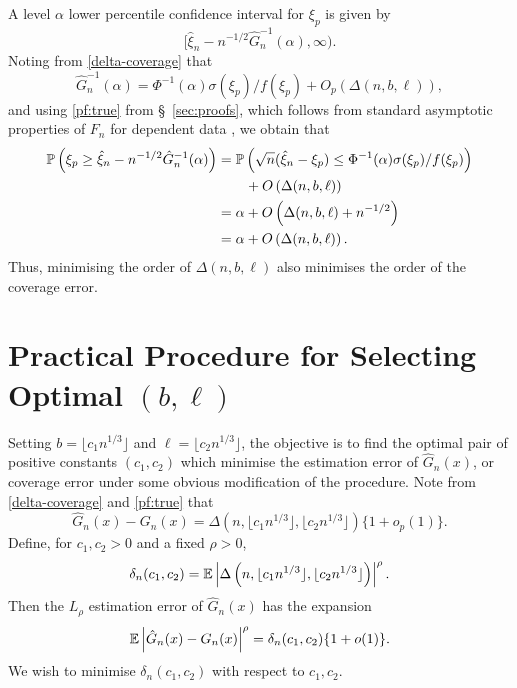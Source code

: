 \documentclass[a4paper, 12pt]{article}
\theoremstyle{plain}
\theoremstyle{definition}
\newcommand{\prob}{{\Bbb P}}
\newcommand{\expn}{{\Bbb E}}
\begin{document}
A level $\alpha$ lower percentile confidence interval for $\xi_{p}$ is given by
\begin{equation*}
[\hat{\xi}_{n}-n^{-1/2}\hat{G}_{n}^{-1}(\alpha), \infty).
\end{equation*}
Noting from \eqref{delta-coverage} that
\begin{equation*}
\hat{G}_{n}^{-1}(\alpha)=\Phi^{-1}(\alpha)\sigma(\xi_{p})/f(\xi_{p})+O_{p}\left(\Delta(n, b, \ell)\right),
\end{equation*}
and using \eqref{pf:true} from \S~\ref{sec:proofs}, which follows from standard asymptotic properties of $F_{n}$ for dependent data \citep{LahiriSun:2009}, we obtain that
\begin{align*}
\prob\left(\xi_{p} \geq \hat{\xi}_{n}-n^{-1/2}\hat{G}_{n}^{-1}(\alpha)\right)&=\prob\left(\sqrt{n}(\hat{\xi}_{n}-\xi_{p})\leq \Phi^{-1}(\alpha)\sigma(\xi_{p})/f(\xi_{p})\right) \\
& \qquad +O\left(\Delta(n,b,\ell)\right) \\
&= \alpha + O\left(\Delta(n,b,\ell)+n^{-1/2}\right) \\
&= \alpha + O\left(\Delta(n,b,\ell)\right) .
\end{align*}
Thus, minimising the order of $\Delta(n,b,\ell)$ also minimises the order of the coverage error.

\section{Practical Procedure for Selecting Optimal $(b,\ell)$}
\label{sec:empirical}

Setting $b=\lfloor c_{1}n^{1/3}\rfloor$ and $\ell= \lfloor c_{2}n^{1/3} \rfloor$, the objective is to find the optimal pair of positive constants $(c_{1}, c_{2})$ which minimise the estimation error of $\hat{G}_{n}(x)$, or coverage error under some obvious modification of the procedure. Note from \eqref{delta-coverage} and \eqref{pf:true} that
\begin{equation} \label{empirical}
\hat{G}_{n}(x)-G_{n}(x)=\Delta \left(n, \lfloor c_{1}n^{1/3} \rfloor, \lfloor c_{2}n^{1/3} \rfloor \right)\{1+o_{p}(1)\} .
\end{equation}
Define, for $c_{1}, c_{2}>0$ and a fixed $\rho>0$,
\begin{equation*}
\delta_{n}(c_{1}, c_{2})=\expn\left| \Delta \left(n, \lfloor c_{1}n^{1/3} \rfloor,  \lfloor c_{2}n^{1/3} \rfloor \right)\right|^{\rho}.
\end{equation*}
Then the $L_{\rho}$ estimation error of $\hat{G}_{n}(x)$ has the expansion
\begin{equation} \label{Lrho-error}
\expn\left|\hat{G}_{n}(x)-G_{n}(x)\right|^{\rho}=\delta_{n}(c_{1},c_{2})\{1+o(1)\} .
\end{equation}
We wish to minimise $\delta_{n}(c_{1},c_{2})$ with respect to $c_{1}, c_{2}$.
\end{document}
